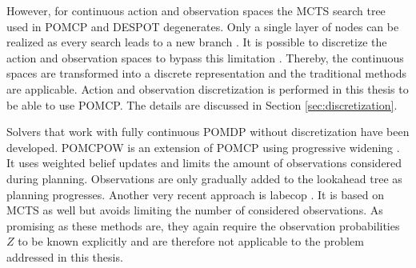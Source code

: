 However, for continuous action and observation spaces the MCTS search tree used in POMCP and DESPOT degenerates. Only a single layer of nodes can be realized as every search leads to a new branch \parencite{online_pomdp_cont}. It is possible to discretize the action and observation spaces to bypass this limitation \parencite{pomcp_continuous}. Thereby, the continuous spaces are transformed into a discrete representation and the traditional methods are applicable. Action and observation discretization is performed in this thesis to be able to use POMCP. The details are discussed in Section \ref{sec:discretization}.

Solvers that work with fully continuous POMDP without discretization have been developed. POMCPOW is an extension of POMCP using progressive widening \parencite{online_pomdp_cont}. It uses weighted belief updates
and limits the amount of observations considered during planning. Observations are only gradually added to the lookahead tree as planning progresses. Another very recent approach is \gls{labecop} \parencite{online-cont-pomdp-2}. It is based on MCTS as well but avoids limiting the number of considered observations. As promising as these methods are, they again require the observation probabilities $Z$ to be known explicitly and are therefore not applicable to the problem addressed in this thesis.








